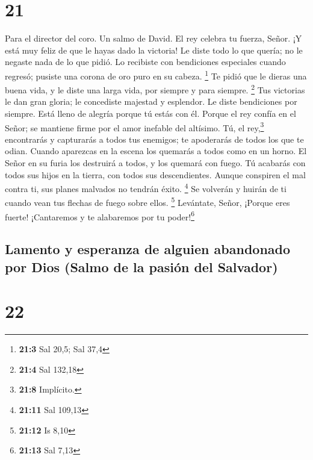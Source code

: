 \hypertarget{section-20}{%
\section{21}\label{section-20}}

Para el director del coro. Un salmo de David.  El rey
celebra tu fuerza, Señor. ¡Y está muy feliz de que le hayas dado la
victoria!  Le diste todo lo que quería; no le negaste nada
de lo que pidió.  Lo recibiste con bendiciones especiales
cuando regresó; pusiste una corona de oro puro en su cabeza. \footnote{\textbf{21:3}
  Sal 20,5; Sal 37,4}  Te pidió que le dieras una buena
vida, y le diste una larga vida, por siempre y para siempre. \footnote{\textbf{21:4}
  Sal 132,18}  Tus victorias le dan gran gloria; le
concediste majestad y esplendor.  Le diste bendiciones por
siempre. Está lleno de alegría porque tú estás con él. 
Porque el rey confía en el Señor; se mantiene firme por el amor inefable
del altísimo.  Tú, el rey,\footnote{\textbf{21:8}
  Implícito.} encontrarás y capturarás a todos tus enemigos; te
apoderarás de todos los que te odian.  Cuando aparezcas en
la escena los quemarás a todos como en un horno. El Señor en su furia
los destruirá a todos, y los quemará con fuego.  Tú
acabarás con todos sus hijos en la tierra, con todos sus descendientes.
 Aunque conspiren el mal contra ti, sus planes malvados
no tendrán éxito. \footnote{\textbf{21:11} Sal 109,13} 
Se volverán y huirán de ti cuando vean tus flechas de fuego sobre ellos.
\footnote{\textbf{21:12} Is 8,10}  Levántate, Señor,
¡Porque eres fuerte! ¡Cantaremos y te alabaremos por tu
poder!\footnote{\textbf{21:13} Sal 7,13}

\hypertarget{lamento-y-esperanza-de-alguien-abandonado-por-dios-salmo-de-la-pasiuxf3n-del-salvador}{%
\subsection{Lamento y esperanza de alguien abandonado por Dios (Salmo de
la pasión del
Salvador)}\label{lamento-y-esperanza-de-alguien-abandonado-por-dios-salmo-de-la-pasiuxf3n-del-salvador}}

\hypertarget{section-21}{%
\section{22}\label{section-21}}

